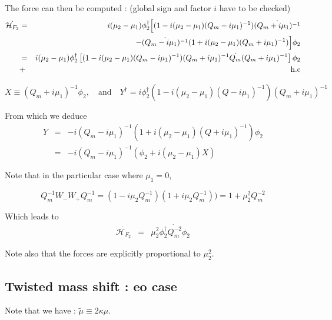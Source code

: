 \documentclass{article}[12pt]
\begin{document}
The force can then be computed : (global sign and factor $i$ have to be checked)
\begin{eqnarray}
 \dot{\mathcal{H}_{F_2}}  &=&   i(\mu_2-\mu_1) \phi_2^{\dagger} \Big[ ( 1 - i(\mu_2 - \mu_1) 
  (Q_m - i \mu_1)^{-1}) \dot{(Q_m+i\mu_1)^{-1}}  \\
 &&- \dot{(Q_m - i    \mu_1)^{-1}} (1+ i (\mu_2 - \mu_1) (Q_m+i \mu_1)^{-1})\Big] \phi_2 \\
&=&  i(\mu_2-\mu_1) \phi_2^{\dagger} \left[  ( 1 - i(\mu_2 - \mu_1) 
  (Q_m - i\mu_1)^{-1}) ( Q_m+i\mu_1)^{-1} \dot{Q_m} (Q_m+i\mu_1)^{-1}
\right] \phi_2 \\  &+& \rm{h.c}
\end{eqnarray}

\begin{equation}
X\equiv (Q_m+i\mu_1)^{-1}\phi_2,\quad\textrm{and}\quad Y^{\dagger}=i\phi_2^\dagger
(1 -i (\mu_2-\mu_1) (Q-i\mu_1)^{-1}) (Q_m+i\mu_1)^{-1}
\end{equation}

From which we deduce 
\begin{eqnarray}
Y &=&   -i (Q_m - i \mu_1)^{-1}(1 +  i(\mu_2-\mu_1)(Q+i\mu_1)^{-1})
\phi_2 \\ &=&-i (Q_m - i \mu_1)^{-1}  ( \phi_2  + i(\mu_2-\mu_1)  X)  
\end{eqnarray}


Note that in the particular case where $\mu_1=0$, 

\begin{equation}
Q_m^{-1} W_- W_+ Q_m^{-1} = ( 1 - i\mu_2Q_m^{-1}) (1+ i\mu_2Q_m^{-1}))
= 1 + \mu_2^2 Q_m^{-2}
\end{equation}

Which leads to 
\begin{eqnarray}
 \dot{\mathcal{H}_{F_2}}  &=& \mu_2^2 \phi_2^{\dagger} \dot{Q_m^{-2}} \phi_2
\end{eqnarray}

Note also that the forces are explicitly
proportional to $\mu_2^2$.

\subsection{Twisted mass shift : eo case}

Note that we have : $\widetilde{\mu} \equiv 2 \kappa \mu$.
\end{document}
